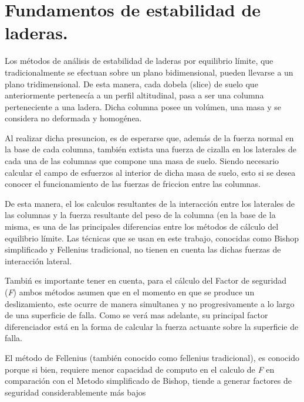 \chapter{Fundamentos de estabilidad de laderas.}
Los m\'etodos de an\'alisis de estabilidad de laderas por equilibrio l\'imite, que tradicionalmente se efectuan sobre un plano bidimensional, pueden llevarse a un plano tridimensional.
De esta manera, cada dobela (slice) de suelo  que anteriormente pertenec\'ia a un perfil altitudinal, pasa a ser una columna perteneciente a una ladera. Dicha columna posee un vol\'umen, una masa y se considera no deformada y homog\'enea.

Al realizar dicha presuncion, es de esperarse que, adem\'as de la fuerza normal en la base de cada columna, tambi\'en extista una fuerza de cizalla en los laterales de cada una de las columnas que compone una masa de suelo. Siendo necesario calcular el campo de esfuerzos al interior de dicha masa de suelo, esto si se desea conocer el funcionamiento de las fuerzas de friccion entre las columnas.

De esta manera, el los calculos resultantes de la interacci\'on entre los laterales de las columnas y la fuerza resultante del peso de la columna (en la base de la misma, es una de las principales diferencias entre los m\'etodos de c\'alculo del equilibrio l\'imite. Las t\'ecnicas que se usan en este trabajo, conocidas como Bishop simplificado y Fellenius tradicional, no tienen en cuenta las dichas fuerzas de interacci\'on lateral.

Tambi\'n es importante tener en cuenta, para el c\'alculo del Factor de seguridad (\textit{F}) ambos m\'etodos asumen que en el momento en que se produce un deslizamiento, este ocurre de manera simultanea y no progresivamente a lo largo de una superficie de falla. Como se ver\'a mas adelante, su principal factor diferenciador est\'a en la forma de calcular la fuerza actuante sobre la superficie de falla.

El m\'etodo de Fellenius (tambi\'en conocido como fellenius tradicional), es conocido porque si bien, requiere menor capacidad de computo en el calculo de \textit{F} en comparaci\'on con el Metodo simplificado de Bishop, tiende a generar factores de seguridad considerablemente m\'as bajos
